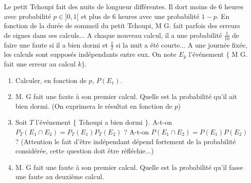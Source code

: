 \documentclass[a4paper, 11pt,reqno]{article}
\begin{document}
\begin{exercice}
Le petit Tchoupi fait des nuits de longueur différentes. %
Il dort moins de 6 heures avec probabilité $p\in ]0,1[$ et plus de 6 heures avec une probabilité $1-p$. 
En fonction de la durée de sommeil du petit Tchoupi, M G. fait parfois des erreurs de signes dans ses calculs... A chaque nouveau calcul, il a une probabilité $\frac{1}{10} $ de faire une faute si il a bien dormi et $\frac{1}{2}$ si la nuit a été  courte... A une journée fixée, les calculs sont supposés indépendants entre eux. On note $E_k$ l'événement $\{$ M G. fait une erreur au calcul $k\}$.
\begin{enumerate}
\item Calculer, en fonction de $p$, $P(E_1)$. 
\item M. G fait une faute à son premier calcul. Quelle est la probabilité qu'il ait bien dormi.  (On exprimera le résultat en fonction de $p$) 
\item Soit $T$ l'événement $\{ $ Tchoupi a bien dormi $\} $.
A-t-on $P_T(E_1\cap E_2)=P_T(E_1) P_T(E_2)$ ? A-t-on $P( E_1\cap E_2)=P(E_1)P(E_2)$ ? (Attention le fait d'être indépendant dépend fortement de la probabilité considérée, cette question doit être réfléchie...) 
\item M. G fait une faute à son premier calcul. Quelle est la probabilité qu'il fasse une faute au deuxième calcul. 
\end{enumerate}
\end{exercice}
\end{document}
